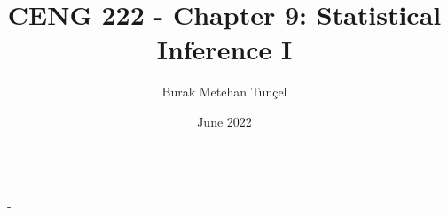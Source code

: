 \documentclass{article}
\title{CENG 222 - Chapter 9: Statistical Inference I}
\author{Burak Metehan Tunçel}
\date{June 2022}
\makeatletter
\renewcommand\maketitle{
{\raggedright %
\begin{center}
{\Large \bfseries \@title}\\[2ex] 
{\large \@author \ - \@date}\\[2ex]
\end{center}}} %
\makeatother
\begin{document}
\maketitle

\begin{multicols}{2}
\setlength{\columnsep}{1.5cm}
\setlength{\columnseprule}{0.2pt}









\end{multicols}
\end{document}
